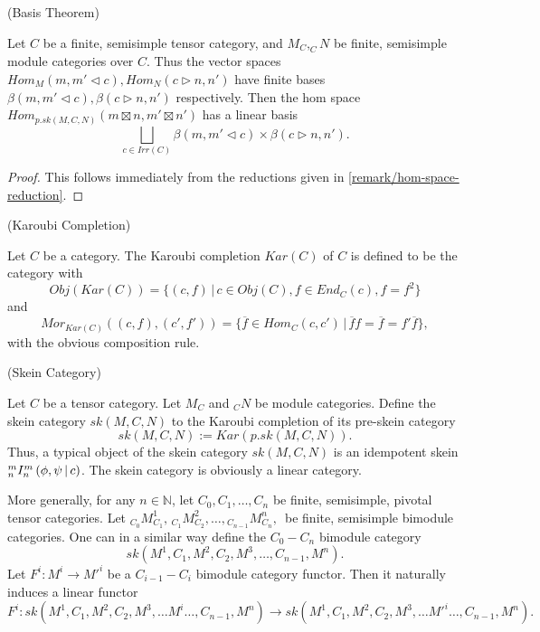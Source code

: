 \begin{proposition} (Basis Theorem) \label{proposition/basis-theorem}

  \noindent Let $C$ be a finite, semisimple tensor category, and
  $M_{C}, _{C}N$ be finite, semisimple module categories over $C$. Thus the
  vector spaces $Hom_{M}(m, m' \lhd c), Hom_{N}(c \rhd n, n')$ have finite bases
  $\beta(m, m' \lhd c), \beta(c \rhd n, n')$ respectively. Then the hom space
  $Hom_{p.sk(M,C,N)}(m \boxtimes n, m' \boxtimes n')$ has a linear basis
  \[
    \bigsqcup_{c \in Irr(C)} \beta(m, m' \lhd c) \times \beta(c \rhd n, n').
  \]
\end{proposition}
\begin{proof}
  This follows immediately from the reductions given in \ref{remark/hom-space-reduction}.
\end{proof}

\begin{definition} (Karoubi Completion)

  \noindent Let $C$ be a category. The Karoubi completion $Kar(C)$ of $C$ is defined to be the category with
  \[
    Obj(Kar(C)) = \{(c, f) \,|\, c \in Obj(C), f \in End_{C}(c), f = f^{2}\}
  \] and
  \[
    Mor_{Kar(C)}((c,f), (c', f')) = \{\overline{f} \in Hom_{C}(c,c') \,|\, \overline{f}f = \overline{f} = f'\overline{f}\},
  \]
  with the obvious composition rule.
\end{definition}

\begin{definition}\label{definition/skein-category} (Skein Category)

  \noindent Let $C$ be a tensor category. Let $M_{C}$ and $_{C}N$ be module
  categories. Define the skein category $sk(M,C,N)$ to the Karoubi completion
  of its pre-skein category
  \[
    sk(M,C,N) := Kar(p.sk(M,C,N)).
  \]
  \noindent Thus, a typical object of the skein category $sk(M,C,N)$ is an
  idempotent skein ${}^{m}_{n} I^{m}_{n} \left( \phi, \psi \,\middle|\, c \right)$. The skein category is obviously a linear category.

  More generally, for any $n \in \mathbb{N}$, let
  $C_{0}, C_{1}, \ldots, C_{n}$ be finite, semisimple, pivotal tensor
  categories. Let
  ${}_{C_{0}}M^{1}_{C_{1}}, \, {}_{C_{1}}M^{2}_{C_{2}}, \ldots, {}_{C_{n-1}}M^{n}_{C_{n}}, \, $
  be finite, semisimple bimodule categories. One can in a similar way define the $C_{0}-C_{n}$ bimodule category
  \[
    sk(M^{1}, C_{1}, M^{2}, C_{2}, M^{3}, \ldots, C_{n-1}, M^{n}).
  \]
  \noindent Let $F^{i}: M^{i} \to M'^{i}$ be a $C_{i-1}-C_{i}$ bimodule category functor. Then it naturally induces a linear functor
  \[
    F^{i}:
    sk(M^{1}, C_{1}, M^{2}, C_{2}, M^{3}, \ldots M^{i} \ldots, C_{n-1}, M^{n})
    \to
    sk(M^{1}, C_{1}, M^{2}, C_{2}, M^{3}, \ldots M'^{i} \ldots, C_{n-1}, M^{n}).
  \]
\end{definition}

